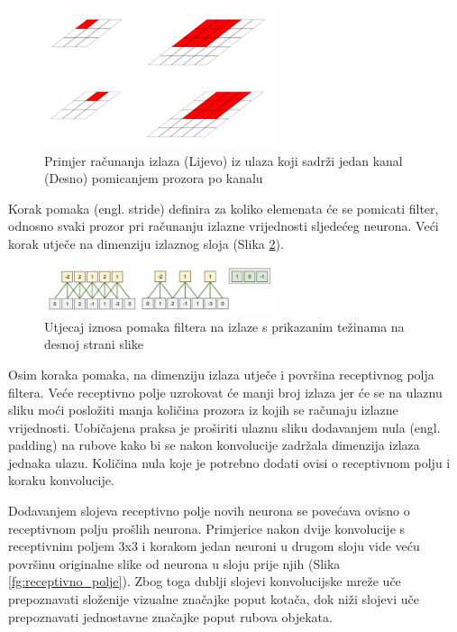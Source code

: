 \documentclass[times, utf8, proizvoljni, numeric]{fer}
\begin{document}
\begin{figure}[!ht]
	\begin{center}
		\captionsetup{justification=centering}
		\includegraphics[width=0.6\textwidth]{./imgs/konvolucija.png}
		\caption{Primjer računanja izlaza (Lijevo) iz ulaza koji sadrži jedan kanal (Desno) pomicanjem prozora po kanalu \cite{DubokoUcenje}}
		\label{fg:konvolucija}
	\end{center}
\end{figure}

Korak pomaka (engl. stride) definira za koliko elemenata će se pomicati filter, odnosno svaki prozor pri računanju izlazne vrijednosti sljedećeg neurona. Veći korak utječe na dimenziju izlaznog sloja (Slika \ref{fg:pomak}).

\begin{figure}[!ht]
	\begin{center}
		\captionsetup{justification=centering}
		\includegraphics[width=0.6\textwidth]{./imgs/pomak.png}
		\caption{Utjecaj iznosa pomaka filtera na izlaze s prikazanim težinama na desnoj strani slike \cite{CS231n}}
		\label{fg:pomak}
	\end{center}
\end{figure}

Osim koraka pomaka, na dimenziju izlaza utječe i površina receptivnog polja filtera. Veće receptivno polje uzrokovat će manji broj izlaza jer će se na ulaznu sliku moći posložiti manja količina prozora iz kojih se računaju izlazne vrijednosti. Uobičajena praksa je proširiti ulaznu sliku dodavanjem nula (engl. padding) na rubove kako bi se nakon konvolucije zadržala dimenzija izlaza jednaka ulazu. Količina nula koje je potrebno dodati ovisi o receptivnom polju i koraku konvolucije.

Dodavanjem slojeva receptivno polje novih neurona se povećava ovisno o receptivnom polju prošlih neurona. Primjerice nakon dvije konvolucije s receptivnim poljem 3x3 i korakom jedan neuroni u drugom sloju vide veću površinu originalne slike od neurona u sloju prije njih (Slika \ref{fg:receptivno_polje}). Zbog toga dublji slojevi konvolucijske mreže uče prepoznavati složenije vizualne značajke poput kotača, dok niži slojevi uče prepoznavati jednostavne značajke poput rubova objekata. 
\end{document}
